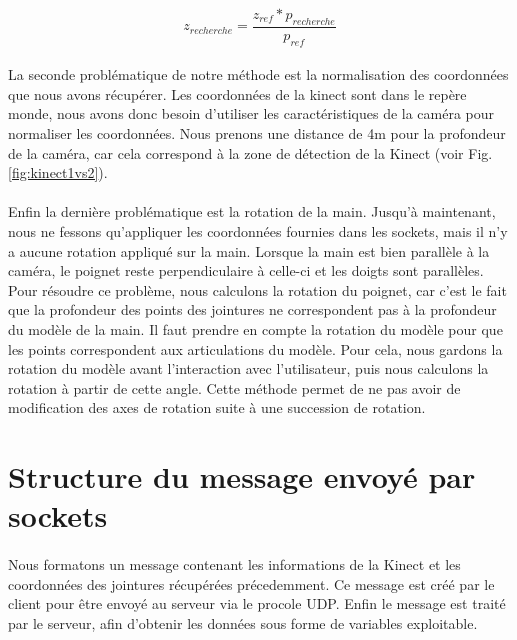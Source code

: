 \begin{equation}
 z_{recherche} = \frac{z_{ref} * p_{recherche}}{p_{ref}}
\end{equation}

\paragraph{}
La seconde problématique de notre méthode est la normalisation des coordonnées que nous avons récupérer. Les coordonnées
de la kinect sont dans le repère monde, nous avons donc besoin d'utiliser les caractéristiques de la caméra pour normaliser
les coordonnées. Nous prenons une distance de 4m pour la profondeur de la caméra, car cela correspond à la zone de détection de
la Kinect (voir Fig. \ref{fig:kinect1vs2}).

\paragraph{}
Enfin la dernière problématique est la rotation de la main. Jusqu'à maintenant, nous ne fessons qu'appliquer les coordonnées
fournies dans les sockets, mais il n'y a aucune rotation appliqué sur la main. Lorsque la main est bien parallèle à la caméra,
le poignet reste perpendiculaire à celle-ci et les doigts sont parallèles. 
Pour résoudre ce problème, nous calculons la rotation du poignet, car c'est le fait que la profondeur des points des jointures
ne correspondent pas à la profondeur du modèle de la main. Il faut prendre en compte la rotation du modèle pour que les points
correspondent aux articulations du modèle. Pour cela, nous gardons la rotation du modèle avant l'interaction avec l'utilisateur,
puis nous calculons la rotation à partir de cette angle. Cette méthode permet de ne pas avoir de modification des axes de rotation
suite à une succession de rotation.

\section{Structure du message envoyé par sockets}
\paragraph{}
Nous formatons un message contenant les informations de la 
Kinect et les coordonnées des jointures récupérées précedemment. Ce 
message est créé par le client pour être envoyé au serveur via le 
procole UDP. Enfin le message est traité par le serveur, afin d'obtenir 
les données sous forme de variables exploitable.

